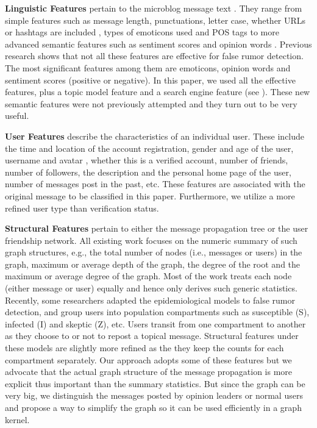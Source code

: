 {\bf Linguistic Features}
pertain to the microblog message text \cite{qazvinian2011rumor}.
They range from simple features such as message length, punctuations,
letter case, whether URLs or hashtags are included
\cite{ratkiewicz2010detecting},
types of emoticons used and POS tags \cite{hassan2010s} to more
advanced semantic features such as sentiment scores
\cite{castillo2011information,qazvinian2011rumor} and
opinion words \cite{KwonCJCW13}.
Previous research \cite{yang2012automatic,KwonCJCW13}
shows that not all these features are effective for false rumor detection.
The most significant features among them are emoticons, opinion words and
sentiment scores (positive or negative).
In this paper, we used all the effective features,
plus a topic model feature and a search engine feature
(see ).
These new semantic features were not previously attempted and they
turn out to be very useful.

{\bf User Features} describe the characteristics of an individual user.
These include the time and location of the account registration, gender
and age of the user, username and avatar \cite{MorrisCRHS12},
whether this is a verified account, number of friends,
number of followers, the description and the personal home page of the user,
number of messages post in the past, etc. \cite{castillo2011information}
These features are associated with the
original message to be classified in this paper. Furthermore, we
utilize a more refined user type than verification status.

{\bf Structural Features} pertain to either the message propagation
tree or the user friendship network. All existing work
\cite{castillo2011information,qazvinian2011rumor,mendoza2010twitter}
focuses on the numeric summary of such graph structures,
e.g., the total number of
nodes (i.e., messages or users) in the graph, maximum or average depth of
the graph, the degree of the root and the maximum or average degree of the
graph. Most of the work treats each node (either message or user)
equally and hence only derives such generic statistics.
Recently, some researchers \cite{jin2013epidemiological,bao2013new}
adapted the epidemiological
models to false rumor detection, and group users into population compartments
such as susceptible (S), infected (I) and skeptic (Z), etc. Users transit
from one compartment to another as they choose to or not to
repost a topical message. Structural features under these models are
slightly more refined as the they keep the counts for each compartment
separately. Our approach adopts some of these features but we advocate that
the actual graph structure of the message propagation is more explicit thus
important than the summary statistics. But since the graph can be very big,
we distinguish the messages posted by opinion leaders or normal users and
propose a way to simplify the graph so it can be used efficiently
in a graph kernel.

